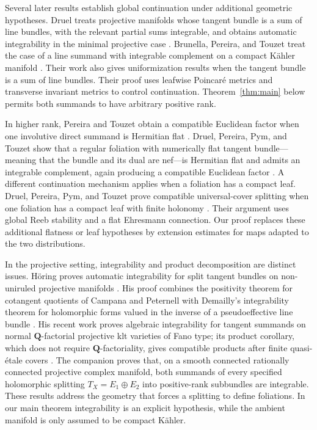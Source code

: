 Several later results establish global continuation under additional
geometric hypotheses. Druel treats projective manifolds whose tangent
bundle is a sum of line bundles, with the relevant partial sums
integrable, and obtains automatic integrability in the minimal
projective case \cite[Theorems~1 and~2]{Druel00}. Brunella, Pereira, and Touzet treat the case of a
line summand with integrable complement on a compact K\"ahler manifold
\cite[Theorem~1.1(i)]{BPT06}. Their work also gives uniformization
results when the tangent bundle is a sum of line bundles. Their proof
uses leafwise Poincar\'e metrics and transverse invariant metrics to
control continuation. Theorem~\ref{thm:main} below permits both summands
to have arbitrary positive rank.

In higher rank, Pereira and Touzet obtain a compatible Euclidean factor
when one involutive direct summand is Hermitian flat
\cite[Theorem~B]{PT13}. Druel, Pereira, Pym, and Touzet show that a
regular foliation with numerically flat tangent bundle---meaning that
the bundle and its dual are nef---is Hermitian flat and admits an
integrable complement, again producing a compatible Euclidean factor
\cite[Theorem~1.1]{DPPT24}.
A different continuation mechanism applies when a foliation has a compact
leaf. Druel, Pereira, Pym, and Touzet prove compatible
universal-cover splitting when one foliation has a compact leaf with
finite holonomy \cite[Theorem~1.4]{DPPT22}. Their argument uses global
Reeb stability and a flat Ehresmann connection. Our proof replaces
these additional flatness or leaf hypotheses by extension estimates
for maps adapted to the two distributions.

In the projective setting, integrability and product decomposition are
distinct issues. H\"oring proves automatic integrability for split
tangent bundles on non-uniruled projective manifolds
\cite[Theorem~1.3]{Horing07}. His proof combines the positivity theorem
for cotangent quotients of Campana and Peternell
\cite[Theorems~0.1 and~1.8]{CP11} with Demailly's integrability theorem
for holomorphic forms valued in the inverse of a pseudoeffective line
bundle \cite[Main Theorem]{Demailly02}. His recent work proves algebraic
integrability for tangent summands on normal $\mathbf Q$-factorial
projective klt varieties of Fano type; its product corollary, which does
not require $\mathbf Q$-factoriality, gives compatible products after
finite quasi-\'etale covers
\cite[Theorem~1.1 and Corollary~1.2]{Horing26}.
The companion \cite[Theorem~1.1]{OpenAIRCSplitting2026} proves that,
on a smooth connected rationally connected projective complex manifold,
both summands of every specified holomorphic splitting
$T_X=E_1\oplus E_2$ into positive-rank subbundles are integrable.
These results address
the geometry that forces a splitting to define foliations. In our main
theorem integrability is an explicit hypothesis, while the ambient
manifold is only assumed to be compact K\"ahler.

